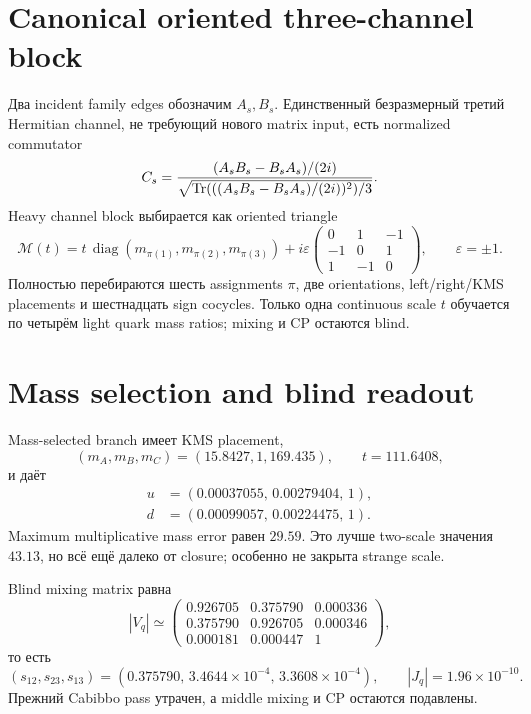 \section{Canonical oriented three-channel block}

Два incident family edges обозначим $A_s,B_s$. Единственный безразмерный
третий Hermitian channel, не требующий нового matrix input, есть normalized
commutator
\begin{equation}
 C_s=\frac{(A_sB_s-B_sA_s)/(2i)}
 {\sqrt{\operatorname{Tr}(((A_sB_s-B_sA_s)/(2i))^2)/3}}.
\end{equation}
Heavy channel block выбирается как oriented triangle
\begin{equation}
 \mathcal M(t)=t\,\operatorname{diag}(m_{\pi(1)},m_{\pi(2)},m_{\pi(3)})
 +i\varepsilon
 \begin{pmatrix}
 0&1&-1\\
 -1&0&1\\
 1&-1&0
 \end{pmatrix},
 \qquad \varepsilon=\pm1.
\end{equation}
Полностью перебираются шесть assignments $\pi$, две orientations,
left/right/KMS placements и шестнадцать sign cocycles. Только одна continuous
scale $t$ обучается по четырём light quark mass ratios; mixing и CP остаются
blind.

\section{Mass selection and blind readout}

Mass-selected branch имеет KMS placement,
\begin{equation}
 (m_A,m_B,m_C)=(15.8427,1,169.435),
 \qquad t=111.6408,
\end{equation}
и даёт
\begin{align}
 u&=(0.00037055,\,0.00279404,\,1),\\
 d&=(0.00099057,\,0.00224475,\,1).
\end{align}
Maximum multiplicative mass error равен $29.59$. Это лучше two-scale
значения $43.13$, но всё ещё далеко от closure; особенно не закрыта strange
scale.

Blind mixing matrix равна
\begin{equation}
 |V_q|\simeq
 \begin{pmatrix}
 0.926705&0.375790&0.000336\\
 0.375790&0.926705&0.000346\\
 0.000181&0.000447&1
 \end{pmatrix},
\end{equation}
то есть
\begin{equation}
 (s_{12},s_{23},s_{13})
 =(0.375790,\,3.4644\times10^{-4},\,3.3608\times10^{-4}),
 \qquad |J_q|=1.96\times10^{-10}.
\end{equation}
Прежний Cabibbo pass утрачен, а middle mixing и CP остаются подавлены.

